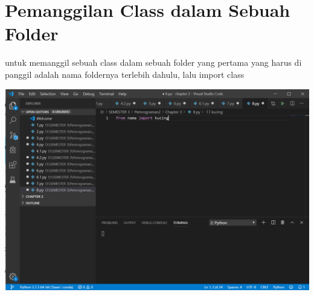 \documentclass{article}
\begin{document}
\section{Pemanggilan Class dalam Sebuah Folder}
untuk memanggil sebuah class dalam sebuah folder yang pertama yang harus di panggil adalah nama foldernya terlebih dahulu, lalu import class

\begin{center}
    \includegraphics[width=.8\textwidth]{keterampilan/8.PNG}
\end{center}
\end{document}
